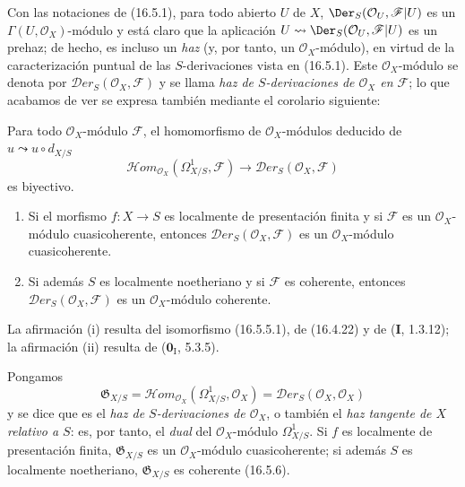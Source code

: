 \begin{env}[16.5.4]
\label{IV.16.5.4}
Con las notaciones de (16.5.1), para todo abierto $U$ de $X$,
$\Der_S(\mathcal{O}_U,\mathscr{F}|U)$ es un
$\Gamma(U,\mathcal{O}_X)$-módulo y está claro que la aplicación
$U\leadsto\Der_S(\mathcal{O}_U,\mathscr{F}|U)$ es un
prehaz; de hecho, es incluso un \emph{haz} (y, por tanto, un
$\mathcal{O}_X$-módulo), en virtud de la caracterización puntual de las
$S$-derivaciones vista en (16.5.1). Este $\mathcal{O}_X$-módulo se denota por
$\mathscr{D}\!er_S(\mathcal{O}_X,\mathscr{F})$ y se llama
\emph{haz de $S$-derivaciones de $\mathcal{O}_X$ en $\mathscr{F}$}; lo
que acabamos de ver se expresa también mediante el corolario siguiente:
\end{env}

\begin{corollary}[16.5.5]
\label{IV.16.5.5}
Para todo $\mathcal{O}_X$-módulo $\mathscr{F}$, el homomorfismo de
$\mathcal{O}_X$-módulos deducido de $u\leadsto u\circ d_{X/S}$
\[
  \mathscr{H}\!om_{\mathcal{O}_X}(\varOmega_{X/S}^1,\mathscr{F})
  \longrightarrow
  \mathscr{D}\!er_S(\mathcal{O}_X,\mathscr{F})
  \tag{16.5.5.1}
  \label{IV.16.5.5.1}
\]
es biyectivo.
\end{corollary}

\begin{corollary}[16.5.6]
\label{IV.16.5.6}
\begin{enumerate}
\item[\textup{(i)}] Si el morfismo $f:X\to S$ es localmente de presentación finita y
si $\mathscr{F}$ es un $\mathcal{O}_X$-módulo cuasicoherente, entonces
$\mathscr{D}\!er_S(\mathcal{O}_X,\mathscr{F})$ es un
$\mathcal{O}_X$-módulo cuasicoherente.
\item[\textup{(ii)}] Si además $S$ es localmente noetheriano y si $\mathscr{F}$ es
coherente, entonces $\mathscr{D}\!er_S(\mathcal{O}_X,\mathscr{F})$ es un
$\mathcal{O}_X$-módulo coherente.
\end{enumerate}
\end{corollary}

La afirmación (i) resulta del isomorfismo (16.5.5.1), de (16.4.22) y de
(\textbf I, 1.3.12); la afirmación (ii) resulta de ($\mathbf{0}_{\mathrm I}$, 5.3.5).

\begin{env}[16.5.7]
\label{IV.16.5.7}
Pongamos
\[
  \mathfrak{G}_{X/S}=
  \mathscr{H}\!om_{\mathcal{O}_X}(\varOmega_{X/S}^1,\mathcal{O}_X)
  =\mathscr{D}\!er_S(\mathcal{O}_X,\mathcal{O}_X)
  \tag{16.5.7.1}
  \label{IV.16.5.7.1}
\]
y se dice que es el \emph{haz de $S$-derivaciones de
$\mathcal{O}_X$}, o también el \emph{haz tangente de $X$ relativo a
$S$}: es, por tanto, el \emph{dual} del $\mathcal{O}_X$-módulo
$\varOmega_{X/S}^1$. Si $f$ es localmente de presentación
finita, $\mathfrak{G}_{X/S}$ es un $\mathcal{O}_X$-módulo cuasicoherente; si
además $S$ es localmente noetheriano, $\mathfrak{G}_{X/S}$ es coherente
(16.5.6).
\end{env}

